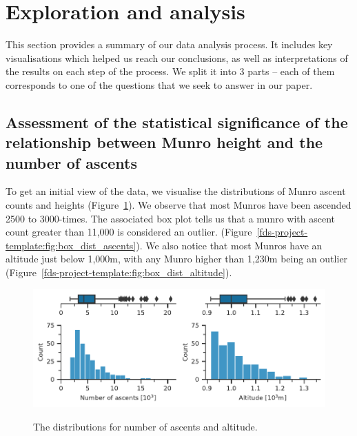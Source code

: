 \documentclass[11pt,a4paper]{article}
\begin{document}
\section{Exploration and  analysis}

This section provides a summary of our data analysis process. It includes key visualisations which helped us reach our conclusions, as well as interpretations of the results on each step of the process. We split it into 3 parts – each of them corresponds to one of the questions that we seek to answer in our paper.

\subsection{Assessment of the statistical significance of the relationship between Munro height and the number of ascents}
To get an initial view of the data, we visualise the distributions of Munro ascent counts and heights (Figure~\ref{fds-project-template:fig:box_dist}). We observe that most Munros have been ascended 2500 to 3000-times. The associated box plot tells us that a munro with ascent count greater than 11,000 is considered an outlier. (Figure~\ref{fds-project-template:fig:box_dist_ascents}). We also notice that most Munros have an altitude just below 1,000m, with any Munro higher than 1,230m being an outlier (Figure~\ref{fds-project-template:fig:box_dist_altitude}).
\begin{figure} [t!]
    \centering
    \includegraphics{report/box_dist.pdf}
    \begin{minipage}[t]{.5\linewidth}
        \centering
        \label{fds-project-template:fig:box_dist_ascents}
    \end{minipage}%
    \begin{minipage}[t]{.5\linewidth}
        \centering
        \label{fds-project-template:fig:box_dist_altitude}
    \end{minipage}
    \caption{The distributions for number of ascents and altitude.}
      \label{fds-project-template:fig:box_dist}
\end{figure}
\end{document}
